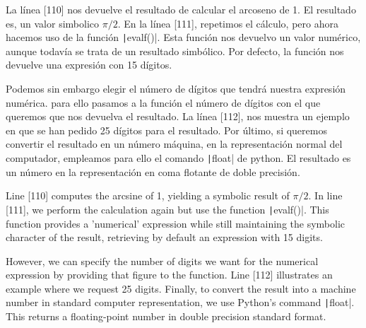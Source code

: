 \begin{paracol}{2}
La línea [110] nos devuelve el resultado de calcular el arcoseno de 1. El resultado es, un valor simbolico $\pi/2$. En la línea [111], repetimos el cálculo, pero ahora hacemos uso de la función \texttt|evalf()|. Esta función nos devuelvo un valor numérico, aunque todavía se trata de un resultado simbólico. Por defecto, la función nos devuelve una expresión con 15 dígitos. 

Podemos sin embargo elegir el número de dígitos que tendrá nuestra expresión numérica. para ello pasamos a la función el número de dígitos con el que queremos que nos devuelva el resultado. La línea [112], nos muestra un ejemplo en que se han pedido 25 dígitos para el resultado. Por último, si queremos convertir el resultado en un número máquina, en la representación normal del computador, empleamos para ello el comando \texttt|float| de python. El resultado es un número en la representación en coma flotante de doble precisión.

\switchcolumn
Line [110] computes the arcsine of 1, yielding a symbolic result of \(\pi/2\). In line [111], we perform the calculation again but use the function \texttt|evalf()|. This function provides a 'numerical' expression while still maintaining the symbolic character of the result, retrieving by default an expression with 15 digits.

However, we can specify the number of digits we want for the numerical expression by providing that figure to the function. Line [112] illustrates an example where we request 25 digits. Finally, to convert the result into a machine number in standard computer representation, we use Python's command \texttt|float|. This returns a floating-point number in double precision standard format.

\end{paracol}

